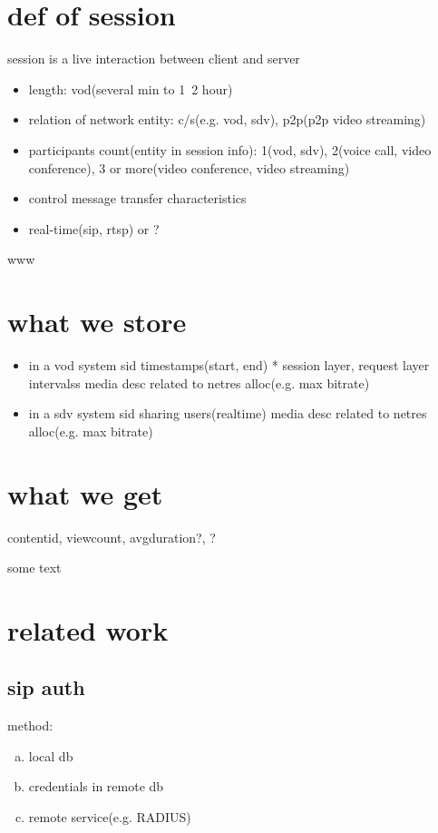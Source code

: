 \documentclass[•]{article}
\begin{document}
\section{def of session}

session is a live interaction between client and server

\begin{itemize}
\item length: vod(several min to 1~2 hour)
\item relation of network entity: c/s(e.g. vod, sdv), p2p(p2p video streaming)
\item participants count(entity in session info): 1(vod, sdv), 2(voice call, video conference), 3 or more(video conference, video streaming)
\item control message transfer characteristics
\item real-time(sip, rtsp) or ?

\end{itemize}

www


\section{what we store}
\begin{itemize}
\item in a vod system
\subitem sid
\subitem timestamps(start, end)
\subitem ** session layer, request layer intervalss \cite{Garcia2009}
\subitem media desc related to netres alloc(e.g. max bitrate)

\item in a sdv system
\subitem sid
\subitem sharing users(realtime)
\subitem media desc related to netres alloc(e.g. max bitrate)


\end{itemize}

\section{what we get}
contentid, viewcount, avgduration?, ?

some text


\section{related work}

\subsection{sip auth}
method:\\
\begin{enumerate}[a.]
\item local db \cite{Nahum2007}
\item credentials in remote db
\item remote service(e.g. RADIUS)
\end{enumerate}
\end{document}
